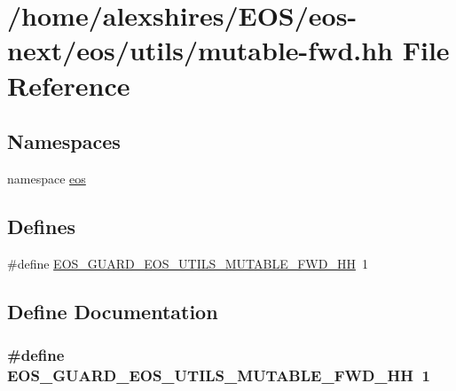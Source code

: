 \hypertarget{mutable-fwd_8hh}{
\section{/home/alexshires/EOS/eos-\/next/eos/utils/mutable-\/fwd.hh File Reference}
\label{mutable-fwd_8hh}
}
\subsection*{Namespaces}
\begin{DoxyCompactItemize}
\item 
namespace \hyperlink{namespaceeos}{eos}
\end{DoxyCompactItemize}
\subsection*{Defines}
\begin{DoxyCompactItemize}
\item 
\#define \hyperlink{mutable-fwd_8hh_a45798574987d1ebba9dfcb0b036e02ee}{EOS\_\-GUARD\_\-EOS\_\-UTILS\_\-MUTABLE\_\-FWD\_\-HH}~1
\end{DoxyCompactItemize}


\subsection{Define Documentation}
\hypertarget{mutable-fwd_8hh_a45798574987d1ebba9dfcb0b036e02ee}{
\subsubsection[{EOS\_\-GUARD\_\-EOS\_\-UTILS\_\-MUTABLE\_\-FWD\_\-HH}]{\setlength{\rightskip}{0pt plus 5cm}\#define EOS\_\-GUARD\_\-EOS\_\-UTILS\_\-MUTABLE\_\-FWD\_\-HH~1}}
\label{mutable-fwd_8hh_a45798574987d1ebba9dfcb0b036e02ee}
